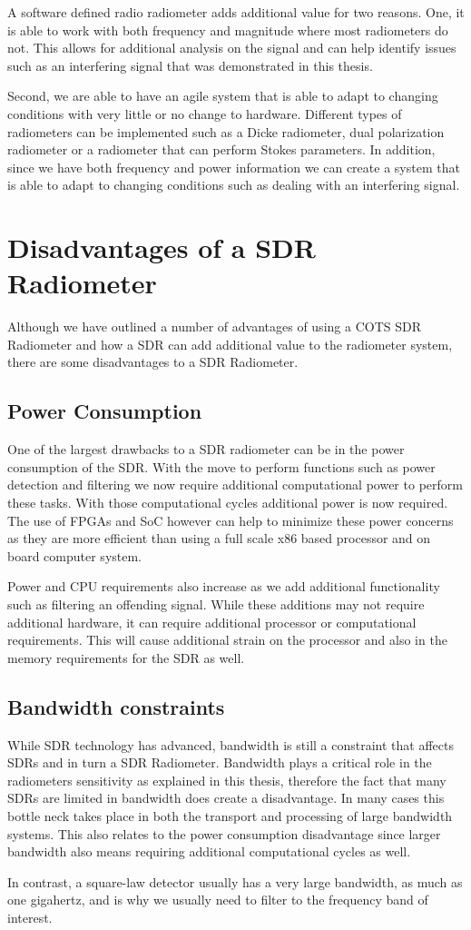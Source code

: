 A software defined radio radiometer adds additional value for two reasons.  One, it is able to work with both frequency and magnitude where most radiometers do not.  This allows for additional analysis on the signal and can help identify issues such as an interfering signal that was demonstrated in this thesis.  

Second, we are able to have an agile system that is able to adapt to changing conditions with very little or no change to hardware.  Different types of radiometers can be implemented such as a Dicke radiometer, dual polarization radiometer or a radiometer that can perform Stokes parameters.  In addition, since we have both frequency and power information we can create a system that is able to adapt to changing conditions such as dealing with an interfering signal.  

\section{Disadvantages of a SDR Radiometer}
Although we have outlined a number of advantages of using a COTS SDR Radiometer and how a SDR can add additional value to the radiometer system, there are some disadvantages to a SDR Radiometer.

\subsection{Power Consumption}
One of the largest drawbacks to a SDR radiometer can be in the power consumption of the SDR.  With the move to perform functions such as power detection and filtering we now require additional computational power to perform these tasks.  With those computational cycles additional power is now required.  The use of FPGAs and SoC however can help to minimize these power concerns as they are more efficient than using a full scale x86 based processor and on board computer system.  

Power and CPU requirements also increase as we add additional functionality such as filtering an offending signal.  While these additions may not require additional hardware, it can require additional processor or computational requirements.  This will cause additional strain on the processor and also in the memory requirements for the SDR as well.

\subsection{Bandwidth constraints}
While SDR technology has advanced, bandwidth is still a constraint that affects SDRs and in turn a SDR Radiometer.  Bandwidth plays a critical role in the radiometers sensitivity as explained in this thesis, therefore the fact that many SDRs are limited in bandwidth does create a disadvantage.  In many cases this bottle neck takes place in both the transport and processing of large bandwidth systems.  This also relates to the power consumption disadvantage since larger bandwidth also means requiring additional computational cycles as well.  

In contrast, a square-law detector usually has a very large bandwidth, as much as one gigahertz, and is why we usually need to filter to the frequency band of interest.  
